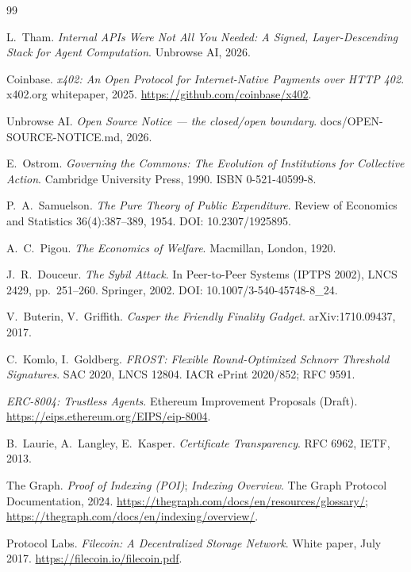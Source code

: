 \documentclass[11pt]{article}
\begin{document}
\begin{thebibliography}{99}

 L.~Tham. \emph{Internal APIs Were Not All You Needed: A
Signed, Layer-Descending Stack for Agent Computation}. Unbrowse AI, 2026.

 Coinbase. \emph{x402: An Open Protocol for Internet-Native Payments
over HTTP 402}. x402.org whitepaper, 2025. \url{https://github.com/coinbase/x402}.

 Unbrowse AI. \emph{Open Source Notice --- the closed/open
boundary}. docs/OPEN-SOURCE-NOTICE.md, 2026.

 E.~Ostrom. \emph{Governing the Commons: The Evolution of
Institutions for Collective Action}. Cambridge University Press, 1990. ISBN
0-521-40599-8.

 P.~A.~Samuelson. \emph{The Pure Theory of Public Expenditure}.
Review of Economics and Statistics 36(4):387--389, 1954. DOI: 10.2307/1925895.

 A.~C.~Pigou. \emph{The Economics of Welfare}. Macmillan, London,
1920.

 J.~R.~Douceur. \emph{The Sybil Attack}. In Peer-to-Peer Systems
(IPTPS 2002), LNCS 2429, pp.~251--260. Springer, 2002. DOI:
10.1007/3-540-45748-8\_24.

 V.~Buterin, V.~Griffith. \emph{Casper the Friendly Finality
Gadget}. arXiv:1710.09437, 2017.

 C.~Komlo, I.~Goldberg. \emph{FROST: Flexible Round-Optimized Schnorr
Threshold Signatures}. SAC 2020, LNCS 12804. IACR ePrint 2020/852; RFC 9591.

 \emph{ERC-8004: Trustless Agents}. Ethereum Improvement Proposals
(Draft). \url{https://eips.ethereum.org/EIPS/eip-8004}.

 B.~Laurie, A.~Langley, E.~Kasper. \emph{Certificate Transparency}.
RFC 6962, IETF, 2013.

 The Graph. \emph{Proof of Indexing (POI)}; \emph{Indexing
Overview}. The Graph Protocol Documentation, 2024.
\url{https://thegraph.com/docs/en/resources/glossary/};
\url{https://thegraph.com/docs/en/indexing/overview/}.

 Protocol Labs. \emph{Filecoin: A Decentralized Storage
Network}. White paper, July 2017. \url{https://filecoin.io/filecoin.pdf}.
\end{thebibliography}
\end{document}

